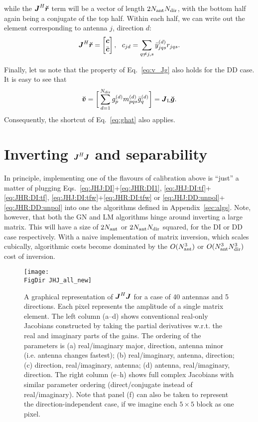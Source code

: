 \documentclass[useAMS,usenatbib]{mn2e}
\makeatletter
\newcommand{\mat}[1]{{\bmath{#1}}}
\newcommand{\JJ}{\mat{J}} %
\newcommand{\JHJ}{\JJ^H\JJ} %
\newcommand{\Matrix}[2]{\left [ \begin{array}{@{}#1@{}}#2\end{array} \right ]}
\newcommand{\AUG}[1]{\bmath{\breve{#1}}}
\newcommand{\Gg}{\AUG{g}}
\newcommand{\Rr}{\AUG{r}}
\newcommand{\Vv}{\AUG{v}}
\newcommand{\LEFT}{\mathrm{L}}
\newcommand{\FigDir}{./}
\numberwithin{equation}{section}
\makeatother
\begin{document}
while the $\JJ^H\Rr$ term will be a vector of length $2N_\mathrm{ant}N_\mathrm{dir}$, with the bottom half again being
a conjugate of the top half. Within each half, we can write out the element corresponding to 
antenna $j$, direction $d$: 
\begin{equation}
\label{eq:JHR:DD:unpol}
\JJ^H\Rr = \Matrix{c}{\bmath{c}\\\bar{\bmath{c}}},~~c_{jd} = \sum\limits_{q\ne j,s} 
\yydH_{jqs} r_{jqs}.
\end{equation}

Finally, let us note that the property of Eq.~\ref{eq:v_Jg} also holds for the DD case. It is easy to see that
\begin{equation}
\label{eq:v_Jg:dd}
\Vv = \bigg [ \sum_{d=1}^{\Nd} \ggd_p \mmd_{pqs} \ggdH_q \bigg ] = \JJ_\LEFT \Gg.
\end{equation}
Consequently, the shortcut of Eq.~\ref{eq:ghat} also applies.

\section{Inverting $\JJ^H\JJ$ and separability}
\label{sec:separability}

In principle, implementing one of the flavours of calibration above is ``just'' a matter of  
plugging Eqs.~\ref{eq:JHJ:DI}+\ref{eq:JHR:DI1}, \ref{eq:JHJ:DI:tf}+\ref{eq:JHR:DI:tf},
\ref{eq:JHJ:DI:tfw}+\ref{eq:JHR:DI:tfw} or \ref{eq:JHJ:DD:unpol}+\ref{eq:JHR:DD:unpol} into one the 
algorithms defined in 
Appendix~\ref{sec:algs}. Note, however, that both the GN and LM algorithms hinge around 
inverting a large matrix. This will have a size of $2N_\mathrm{ant}$ or $2N_\mathrm{ant}N_\mathrm{dir}$ squared, 
for the DI or DD case respectively. With a naive implementation of matrix inversion, 
which scales cubically, algorithmic costs become dominated by the $O(N_\mathrm{ant}^3)$ or $O(N_\mathrm{ant}^3N_\mathrm{dir}^3)$
cost of inversion.


\begin{figure*}
\begin{center}
\texttt{[image: \\FigDir JHJ\_all\_new]}
\caption{\label{fig:JHJ}A graphical representation of $\JHJ$ for a case of 
40 antennas and 5 directions. Each pixel represents the amplitude of a single matrix element.
The left column (a--d) shows conventional real-only Jacobians constructed by taking the partial derivatives w.r.t. 
the real and imaginary parts of the gains. The ordering of the parameters is (a) real/imaginary major, 
direction, antenna minor (i.e. antenna changes fastest); (b) real/imaginary, antenna, direction; (c) direction, 
real/imaginary, antenna; (d) antenna, real/imaginary, direction. The right column (e--h) shows full complex Jacobians with similar parameter ordering (direct/conjugate instead of real/imaginary). Note that panel (f) can also be taken to represent the direction-independent case, if we imagine each $5\times5$ block as one pixel.}
\end{center}
\end{figure*}
\end{document}
